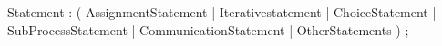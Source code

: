 %
%
%
\begin{rail}
Statement : ( AssignmentStatement
            | Iterativestatement
            | ChoiceStatement
            | SubProcessStatement
            | CommunicationStatement
            | OtherStatements
            ) ;
\end{rail}

